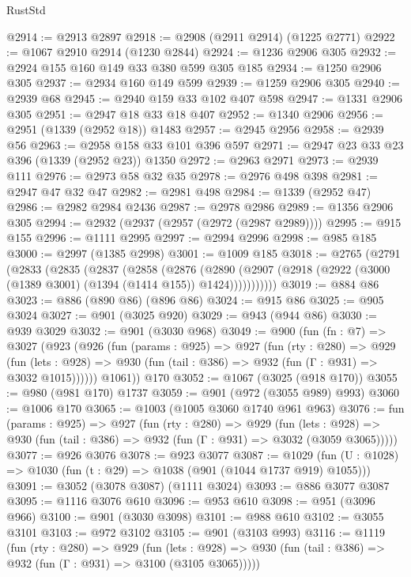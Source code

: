 \begin{lexlean}{RustStd}
\begin{coremodule}
{\begin{coremodule}
{{{{{{{{{{{{{{@2914 := @2913 @2897
@2918 := @2908 (@2911 @2914) (@1225 @2771)
@2922 := @1067 @2910 @2914 (@1230 @2844)
@2924 := @1236 @2906 @305
@2932 := @2924 @155 @160 @149 @33 @380 @599 @305 @185
@2934 := @1250 @2906 @305
@2937 := @2934 @160 @149 @599
@2939 := @1259 @2906 @305
@2940 := @2939 @68
@2945 := @2940 @159 @33 @102 @407 @598
@2947 := @1331 @2906 @305
@2951 := @2947 @18 @33 @18 @407
@2952 := @1340 @2906
@2956 := @2951 (@1339 (@2952 @18)) @1483
@2957 := @2945 @2956
@2958 := @2939 @56
@2963 := @2958 @158 @33 @101 @396 @597
@2971 := @2947 @23 @33 @23 @396 (@1339 (@2952 @23)) @1350
@2972 := @2963 @2971
@2973 := @2939 @111
@2976 := @2973 @58 @32 @35
@2978 := @2976 @498 @398
@2981 := @2947 @47 @32 @47
@2982 := @2981 @498
@2984 := @1339 (@2952 @47)
@2986 := @2982 @2984 @2436
@2987 := @2978 @2986
@2989 := @1356 @2906 @305
@2994 := @2932 (@2937 (@2957 (@2972 (@2987 @2989))))
@2995 := @915 @155
@2996 := @1111 @2995
@2997 := @2994 @2996
@2998 := @985 @185
@3000 := @2997 (@1385 @2998)
@3001 := @1009 @185
@3018 := @2765
    (@2791
      (@2833
        (@2835
          (@2837
            (@2858
              (@2876
                (@2890
                  (@2907 (@2918 (@2922 (@3000 (@1389 @3001) (@1394 (@1414 @155)) @1424)))))))))))
@3019 := @884 @86
@3023 := @886 (@890 @86) (@896 @86)
@3024 := @915 @86
@3025 := @905 @3024
@3027 := @901 (@3025 @920)
@3029 := @943 (@944 @86)
@3030 := @939 @3029
@3032 := @901 (@3030 @968)
@3049 := @900
    (fun (fn : @7) =>
    @3027
      (@923
        (@926
          (fun (params : @925) =>
          @927
            (fun (rty : @280) =>
            @929
              (fun (lets : @928) =>
              @930 (fun (tail : @386) => @932 (fun (Γ : @931) => @3032 @1015))))))
        @1061))
    @170
@3052 := @1067 (@3025 (@918 @170))
@3055 := @980 (@981 @170) @1737
@3059 := @901 (@972 (@3055 @989) @993)
@3060 := @1006 @170
@3065 := @1003 (@1005 @3060 @1740 @961 @963)
@3076 := fun (params : @925) =>
  @927
    (fun (rty : @280) =>
    @929
      (fun (lets : @928) =>
      @930 (fun (tail : @386) => @932 (fun (Γ : @931) => @3032 (@3059 @3065)))))
@3077 := @926 @3076
@3078 := @923 @3077
@3087 := @1029 (fun (U : @1028) => @1030 (fun (t : @29) => @1038 (@901 (@1044 @1737 @919) @1055)))
@3091 := @3052 (@3078 @3087) (@1111 @3024)
@3093 := @886 @3077 @3087
@3095 := @1116 @3076 @610
@3096 := @953 @610
@3098 := @951 (@3096 @966)
@3100 := @901 (@3030 @3098)
@3101 := @988 @610
@3102 := @3055 @3101
@3103 := @972 @3102
@3105 := @901 (@3103 @993)
@3116 := @1119
    (fun (rty : @280) =>
    @929
      (fun (lets : @928) =>
      @930 (fun (tail : @386) => @932 (fun (Γ : @931) => @3100 (@3105 @3065)))))
}}}}}}}}}}}}}}
\end{coremodule}}
\end{coremodule}
\end{lexlean}
